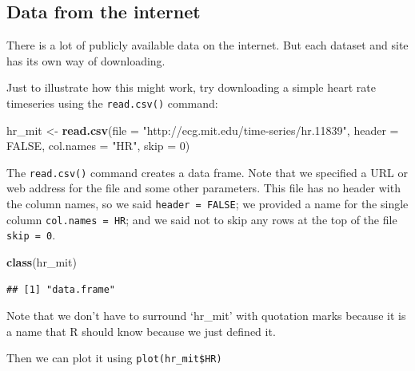 \documentclass[]{article}
\newenvironment{Shaded}{\begin{snugshade}}{\end{snugshade}}
\newcommand{\KeywordTok}[1]{\textcolor[rgb]{0.13,0.29,0.53}{\textbf{#1}}}
\newcommand{\DataTypeTok}[1]{\textcolor[rgb]{0.13,0.29,0.53}{#1}}
\newcommand{\DecValTok}[1]{\textcolor[rgb]{0.00,0.00,0.81}{#1}}
\newcommand{\StringTok}[1]{\textcolor[rgb]{0.31,0.60,0.02}{#1}}
\newcommand{\OtherTok}[1]{\textcolor[rgb]{0.56,0.35,0.01}{#1}}
\newcommand{\OperatorTok}[1]{\textcolor[rgb]{0.81,0.36,0.00}{\textbf{#1}}}
\newcommand{\NormalTok}[1]{#1}
\begin{document}
\subsection{Data from the internet}\label{data-from-the-internet}

There is a lot of publicly available data on the internet. But each
dataset and site has its own way of downloading.

Just to illustrate how this might work, try downloading a simple heart
rate timeseries using the \texttt{read.csv()} command:

\begin{Shaded}
\begin{Highlighting}[]
\NormalTok{hr_mit <-}\StringTok{ }\KeywordTok{read.csv}\NormalTok{(}\DataTypeTok{file =} \StringTok{"http://ecg.mit.edu/time-series/hr.11839"}\NormalTok{, }\DataTypeTok{header =} \OtherTok{FALSE}\NormalTok{, }
    \DataTypeTok{col.names =} \StringTok{"HR"}\NormalTok{, }\DataTypeTok{skip =} \DecValTok{0}\NormalTok{)}
\end{Highlighting}
\end{Shaded}

The \texttt{read.csv()} command creates a data frame. Note that we
specified a URL or web address for the file and some other parameters.
This file has no header with the column names, so we said
\texttt{header\ =\ FALSE}; we provided a name for the single column
\texttt{col.names\ =\ \textquotesingle{}HR\textquotesingle{}}; and we
said not to skip any rows at the top of the file \texttt{skip\ =\ 0}.

\begin{Shaded}
\begin{Highlighting}[]
\KeywordTok{class}\NormalTok{(hr_mit)}
\end{Highlighting}
\end{Shaded}

\begin{verbatim}
## [1] "data.frame"
\end{verbatim}

Note that we don't have to surround `hr\_mit' with quotation marks
because it is a name that R should know because we just defined it.

Then we can plot it using \texttt{plot(hr\_mit\$HR)}

\begin{Shaded}
\end{Shaded}
\end{document}
